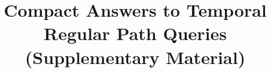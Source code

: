 \documentclass[sigconf]{acmart}
\begin{document}
\title{Compact Answers to Temporal Regular Path Queries (Supplementary Material)}





\end{document}
